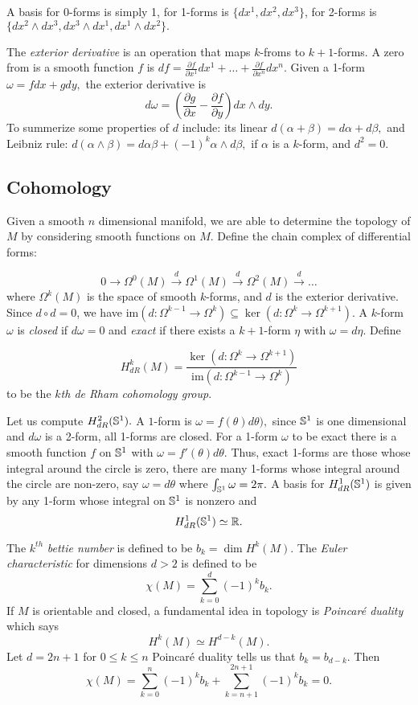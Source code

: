 A basis for 0-forms is simply 1, for 1-forms is $\{dx^1,dx^2,dx^3\}$,
for 2-forms is $\{dx^2\land dx^3, dx^3\land dx^1, dx^1\land dx^2\}.$

The \emph{exterior derivative} is an operation that maps $k$-froms to $k+1$-forms.
A zero from is a smooth function $f$ is $df=\frac{\partial f}{\partial x^1}dx^1+\ldots + \frac{\partial f}{\partial x^n}dx^n.$ Given a 1-form $\omega=fdx+gdy,$ the exterior derivative is
$$d\omega=\left(\frac{\partial g}{\partial x}-\frac{\partial f}{\partial y}\right)dx\land dy.$$
To summerize some properties of $d$ include:
its linear $d(\alpha +\beta)=d\alpha +d\beta,$ and Leibniz rule:
$d(\alpha \land \beta)=d\alpha \beta + (-1)^k \alpha \land d\beta,$ if $\alpha$ is a $k$-form,
and $d^2=0.$

\subsection{Cohomology}

Given a smooth $n$ dimensional manifold, we are able to determine the topology of $M$ by considering
smooth functions on $M$.
Define the chain complex of differential forms:

$$0\rightarrow \Omega^0(M) \xrightarrow{d} \Omega^1(M) \xrightarrow{d} \Omega^2(M)\xrightarrow{d}\ldots$$
where $\Omega^k(M)$ is the space of smooth $k$-forms, and $d$ is the exterior derivative.
Since $d\circ d=0$, we have im$(d:\Omega^{k-1}\rightarrow \Omega^k)\subseteq \ker(d:\Omega^{k}\rightarrow \Omega^{k+1}).$
A $k$-form $\omega$ is \emph{closed} if $d\omega=0$ and \emph{exact} if there exists
a $k+1$-form $\eta$ with $\omega=d\eta.$
Define

$$H_{dR}^k(M)=\frac{\ker(d:\Omega^{k}\rightarrow \Omega^{k+1})}{\text{im}(d:\Omega^{k-1}\rightarrow \Omega^k)}$$
to be the \emph{$k$th de Rham cohomology group}.

Let us compute $H_{dR}^2(\mathbb{S}^1).$ A $1$-form is $\omega=f(\theta)d\theta),$ since $\mathbb{S}^1$ is one
dimensional and $d\omega$ is a 2-form, all 1-forms are closed. For a 1-form $\omega$ to be exact
there is a smooth function $f$ on $\mathbb{S}^1$ with $\omega=f'(\theta)d\theta$.
Thus, exact 1-forms are those whose integral around the circle is zero, there are many 1-forms
whose integral around the circle are non-zero, say $\omega=d\theta$ where $\int_{\mathbb{S}^1}\omega=2\pi.$
A basis for $H_{dR}^1(\mathbb{S}^1)$ is given by any 1-form whose integral on $\mathbb{S}^1$ is nonzero and
$$H_{dR}^1(\mathbb{S}^1)\simeq \mathbb{R}.$$


The $k^{th}$ \emph{bettie number} is defined to be $b_k=\dim H^k(M).$
The \emph{Euler characteristic} for dimensions $d>2$  is defined to be
$$\chi(M)=\sum_{k=0}^d(-1)^kb_k.$$
If $M$ is orientable and closed, a fundamental idea in topology is \emph{Poincar\'e duality} which says
$$H^k(M)\simeq H^{d-k}(M).$$
Let $d=2n+1$ for $0\leq k\leq n$ Poincar\'e duality tells us that $b_k=b_{d-k}.$
Then
$$\chi(M)=\sum_{k=0}^n(-1)^kb_k + \sum_{k=n+1}^{2n+1}(-1)^kb_k=0.$$

